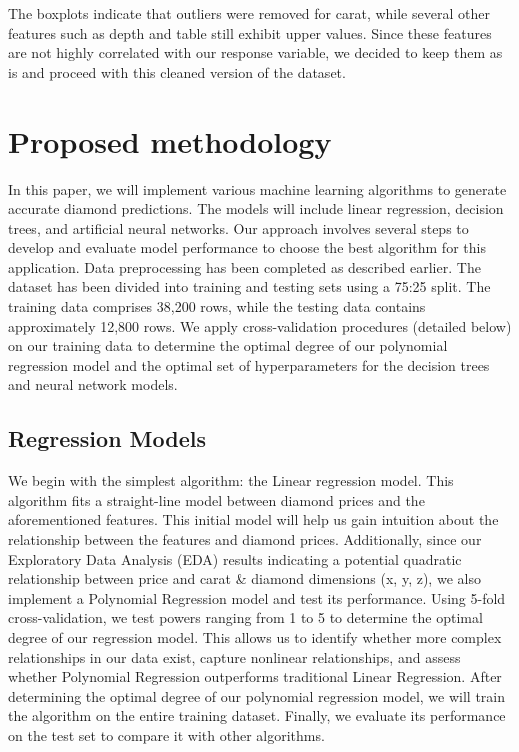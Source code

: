 \documentclass[conference]{IEEEtran}
\begin{document}
The boxplots indicate that outliers were removed for carat, while several other features such as depth and table still exhibit upper values. Since these features are not highly correlated with our response variable, we decided to keep them as is and proceed with this cleaned version of the dataset. 

\section{Proposed methodology}

In this paper, we will implement various machine learning algorithms to generate accurate diamond predictions. The models will include linear regression, decision trees, and artificial neural networks. Our approach involves several steps to develop and evaluate model performance to choose the best algorithm for this application. Data preprocessing has been completed as described earlier. The dataset has been divided into training and testing sets using a 75:25 split. The training data comprises 38,200 rows, while the testing data contains approximately 12,800 rows. We apply cross-validation procedures (detailed below) on our training data to determine the optimal degree of our polynomial regression model and the optimal set of hyperparameters for the decision trees and neural network models.

\subsection{Regression Models}

We begin with the simplest algorithm: the Linear regression model. This algorithm fits a straight-line model between diamond prices and the aforementioned features. This initial model will help us gain intuition about the relationship between the features and diamond prices. Additionally, since our Exploratory Data Analysis (EDA) results indicating a potential quadratic relationship between price and carat \& diamond dimensions (x, y, z), we also implement a Polynomial Regression model and test its performance. Using 5-fold cross-validation, we test powers ranging from 1 to 5 to determine the optimal degree of our regression model. This allows us to identify whether more complex relationships in our data exist, capture nonlinear relationships, and assess whether Polynomial Regression outperforms traditional Linear Regression. After determining the optimal degree of our polynomial regression model, we will train the algorithm on the entire training dataset. Finally, we evaluate its performance on the test set to compare it with other algorithms.
\end{document}
